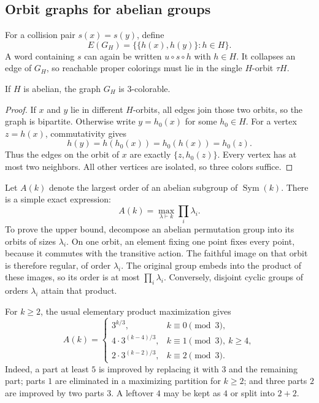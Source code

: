 \documentclass[11pt,a4paper]{article}
\numberwithin{equation}{section}
\theoremstyle{definition}
\theoremstyle{remark}
\newcommand{\Sym}{\operatorname{Sym}}
\begin{document}
\subsection{Orbit graphs for abelian groups}

For a collision pair $s(x)=s(y)$, define
\[
 E(G_H)=\{\{h(x),h(y)\}:h\in H\}.
\]
A word containing $s$ can again be written $u\circ s\circ h$ with $h\in H$.
It collapses an edge of $G_H$, so reachable proper colorings must lie in the
single $H$-orbit $\tau H$.

\begin{lemma}\label{lem:abeliangraph}
If $H$ is abelian, the graph $G_H$ is $3$-colorable.
\end{lemma}
\begin{proof}
If $x$ and $y$ lie in different $H$-orbits, all edges join those two orbits,
so the graph is bipartite. Otherwise write $y=h_0(x)$ for some $h_0\in H$.
For a vertex $z=h(x)$, commutativity gives
\[
 h(y)=h(h_0(x))=h_0(h(x))=h_0(z).
\]
Thus the edges on the orbit of $x$ are exactly $\{z,h_0(z)\}$. Every vertex
has at most two neighbors. All other vertices are isolated, so three colors
suffice.
\end{proof}

Let $A(k)$ denote the largest order of an abelian subgroup of $\Sym(k)$.
There is a simple exact expression:
\begin{equation}\label{eq:abelianmax}
 A(k)=\max_{\lambda\vdash k}\prod_i\lambda_i.
\end{equation}
To prove the upper bound, decompose an abelian permutation group into its
orbits of sizes $\lambda_i$. On one orbit, an element fixing one point fixes
every point, because it commutes with the transitive action. The faithful
image on that orbit is therefore regular, of order $\lambda_i$. The original
group embeds into the product of these images, so its order is at most
$\prod_i\lambda_i$. Conversely, disjoint cyclic groups of orders
$\lambda_i$ attain that product.

For $k\ge2$, the usual elementary product maximization gives
\[
 A(k)=
 \begin{cases}
 3^{k/3},&k\equiv0\pmod3,\\
 4\cdot3^{(k-4)/3},&k\equiv1\pmod3,\ k\ge4,\\
 2\cdot3^{(k-2)/3},&k\equiv2\pmod3.
 \end{cases}
\]
Indeed, a part at least $5$ is improved by replacing it with $3$ and the
remaining part; parts $1$ are eliminated in a maximizing partition for
$k\ge2$; and three parts $2$ are improved by two parts $3$. A leftover $4$
may be kept as $4$ or split into $2+2$.
\end{document}
